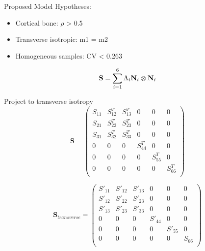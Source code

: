 \documentclass[a4paper,fleqn]{DC_ArtStyle}
\begin{document}
	Proposed Model
	Hypotheses:
	\begin{itemize}
		\item Cortical bone: $\rho$ > 0.5
		\item Transverse isotropic: m1 = m2
		\item Homogeneous samples: CV < 0.263
	\end{itemize}
	\begin{equation}
		\mathbf{S} = \sum_{i=1}^{6} \Lambda_{i} \mathbf{N}_i \otimes \mathbf{N}_i\\
	\end{equation}

	Project to transverse isotropy
	\begin{equation}
		\mathbf{S} =
		\begin{pmatrix}
			S_{11} & S_{12}^T & S_{13}^T & 0 & 0 & 0 \\
			S_{21} & S_{22}^T & S_{23}^T & 0 & 0 & 0 \\
			S_{31} & S_{32}^T & S_{33}^T & 0 & 0 & 0 \\
			0 & 0 & 0 & S_{44}^T & 0 & 0 \\
			0 & 0 & 0 & 0 & S_{55}^T & 0 \\
			0 & 0 & 0 & 0 & 0 & S_{66}^T \\
		\end{pmatrix}
	\end{equation}

	\begin{equation}
		\mathbf{S}_{transverse} =
		\begin{pmatrix}
			S'_{11} & S'_{12} & S'_{13} & 0 & 0 & 0 \\
			S'_{12} & S'_{22} & S'_{23} & 0 & 0 & 0 \\
			S'_{13} & S'_{23} & S'_{33} & 0 & 0 & 0 \\
			0 & 0 & 0 & S'_{44} & 0 & 0 \\
			0 & 0 & 0 & 0 & S'_{55} & 0 \\
			0 & 0 & 0 & 0 & 0 & S_{66} \\
		\end{pmatrix}
	\end{equation}
\end{document}
